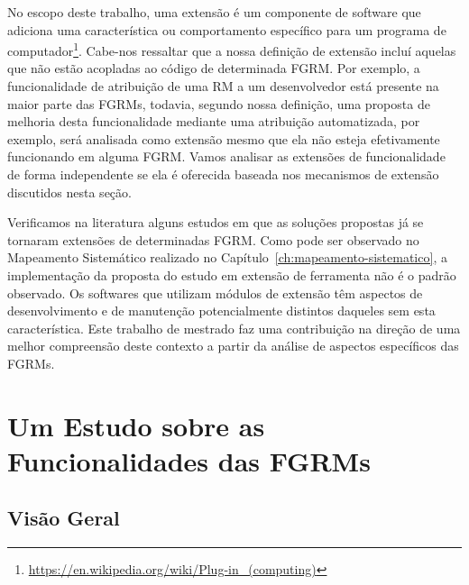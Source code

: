 No escopo deste trabalho, uma extensão é um componente de software que adiciona
uma característica ou comportamento específico para um programa de
computador\footnote{\url{https://en.wikipedia.org/wiki/Plug-in\_(computing)}}.
Cabe-nos ressaltar que a nossa definição de extensão incluí aquelas que não
estão acopladas ao código de determinada FGRM\@. Por exemplo, a funcionalidade
de atribuição de uma RM a um desenvolvedor está presente na maior parte das
FGRMs, todavia, segundo nossa definição, uma proposta de melhoria desta
funcionalidade mediante uma atribuição automatizada, por exemplo, será analisada
como extensão mesmo que ela não esteja efetivamente funcionando em alguma
FGRM\@. Vamos a\-na\-li\-sar as extensões de funcionalidade de forma
independente se ela é oferecida baseada nos mecanismos de extensão discutidos
nesta seção.

Verificamos na literatura alguns estudos em que as soluções propostas já se
tornaram extensões de determinadas FGRM\@. Como pode ser observado no Mapeamento
Sistemático realizado no Capítulo~\ref{ch:mapeamento-sistematico}, a
implementação da proposta do estudo em extensão de ferramenta não é o padrão
observado. Os softwares que utilizam módulos de extensão têm aspectos de
desenvolvimento e de manutenção potencialmente distintos daqueles sem esta
característica. Este trabalho de mestrado faz uma contribuição na direção de uma
melhor compreensão deste contexto a partir da análise de aspectos específicos
das FGRMs.


\section{Um Estudo sobre as Funcionalidades das FGRMs}
\label{sec:caracterizacao_ferramentas}

\subsection{Visão Geral}
\label{subsec:caracterizacao_intro}

